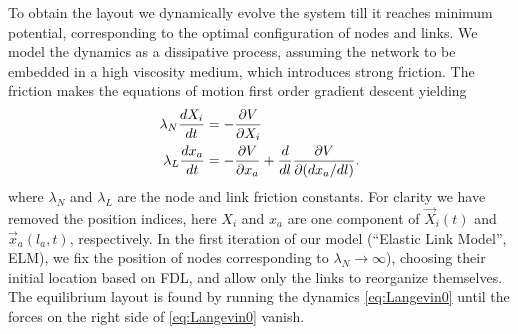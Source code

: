 \documentclass[nofootinbib,preprint,floatfix,endfloats]{revtex4} %
\begin{document}

To obtain the layout we dynamically evolve the system till it reaches minimum potential, corresponding to the optimal configuration of nodes and links.
We model the dynamics as a dissipative process, assuming the network to be embedded in a high viscosity medium, which introduces strong friction.
The friction makes the equations of motion first order gradient descent 
yielding
\begin{align}
    \lambda_N {dX_i\over dt} &= -{\ro V \over \ro X_i} %
    \label{eq:nodes}\\
    \lambda_L {dx_a \over dt} & =  -{\ro V \over \ro x_a} + {d\over dl} {\ro V \over \ro (dx_a /dl)}   \label{eq:Langevin0}.
\end{align}
where $\lambda_N$ and $\lambda_L$ are the node and link friction constants. 
For clarity we have removed the position indices, here $X_i$ and  $x_a$ are one component of $\vec{X}_i(t)$ and  $\vec{x}_a(l_a,t)$, respectively. 
In the first iteration of our model (``Elastic Link Model'', ELM), we fix the position of nodes corresponding to $\lambda_N\to \infty$), choosing their initial location based on FDL, and allow only the links to  reorganize themselves.  
The equilibrium layout is found by %
running the dynamics  \eqref{eq:Langevin0} until the forces on the right side of \eqref{eq:Langevin0} vanish.
\end{document}
